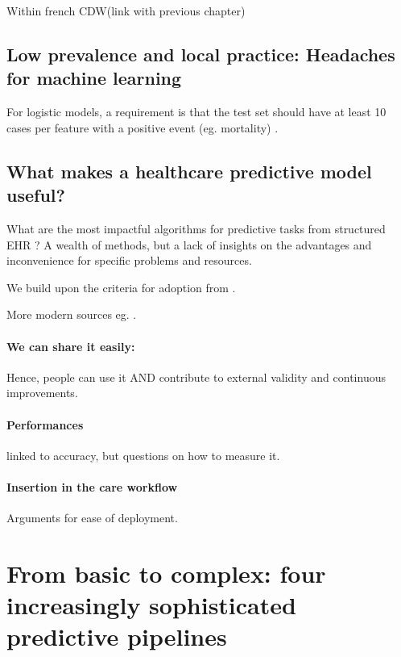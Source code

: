 \documentclass[french,12pt,twoside,a4paper]{book}
\begin{document}
Within french CDW(link with previous chapter)

\subsection{Low prevalence and local practice: Headaches for machine learning}\label{subsec:predictive_models:low_prevalence}

For logistic models, a requirement is that the test set should have at least 10
cases per feature with a positive event (eg. mortality)
\citep{harrell1985regression,wyatt1995commentary}.

\subsection{What makes a healthcare predictive model useful?}\label{subsec:predictive_models:useful}

What are the most impactful algorithms for predictive tasks from structured EHR
? A wealth of methods, but a lack of insights on the advantages and
inconvenience for specific problems and resources.

We build upon the criteria for adoption from \cite{wyatt1995commentary}.

More modern sources eg. \citep{subbaswamy2020development}.

\paragraph{We can share it easily: } Hence, people can use it AND contribute to
external validity and continuous improvements.

\paragraph{Performances} linked to accuracy, but questions on how to measure it.

\paragraph{Insertion in the care workflow}

Arguments for ease of deployment.

\section{From basic to complex: four increasingly sophisticated predictive pipelines}\label{sec:predictive_models:pipelines}
\end{document}
